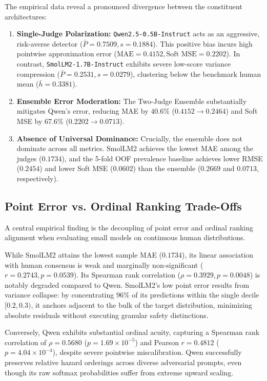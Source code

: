 The empirical data reveal a pronounced divergence between the constituent architectures:
\begin{enumerate}
    \item \textbf{Single-Judge Polarization:} \texttt{Qwen2.5-0.5B-Instruct} acts as an aggressive, risk-averse detector ($\bar{P}=0.7509, s=0.1884$). This positive bias incurs high pointwise approximation error ($\text{MAE}=0.4152, \text{Soft MSE}=0.2202$). In contrast, \texttt{SmolLM2-1.7B-Instruct} exhibits severe low-score variance compression ($\bar{P}=0.2531, s=0.0279$), clustering below the benchmark human mean ($\bar{h}=0.3381$).
    \item \textbf{Ensemble Error Moderation:} The Two-Judge Ensemble substantially mitigates Qwen's error, reducing MAE by $40.6\%$ ($0.4152 \to 0.2464$) and Soft MSE by $67.6\%$ ($0.2202 \to 0.0713$).
    \item \textbf{Absence of Universal Dominance:} Crucially, the ensemble does not dominate across all metrics. SmolLM2 achieves the lowest MAE among the judges ($0.1734$), and the 5-fold OOF prevalence baseline achieves lower RMSE ($0.2454$) and lower Soft MSE ($0.0602$) than the ensemble ($0.2669$ and $0.0713$, respectively).
\end{enumerate}

\subsection{Point Error vs. Ordinal Ranking Trade-Offs}
\label{subsec:error_agreement}

A central empirical finding is the decoupling of point error and ordinal ranking alignment when evaluating small models on continuous human distributions.

While SmolLM2 attains the lowest sample MAE ($0.1734$), its linear association with human consensus is weak and marginally non-significant ($r=0.2743, p=0.0539$). Its Spearman rank correlation ($\rho=0.3929, p=0.0048$) is notably degraded compared to Qwen. SmolLM2's low point error results from variance collapse: by concentrating $96\%$ of its predictions within the single decile $[0.2, 0.3)$, it anchors adjacent to the bulk of the target distribution, minimizing absolute residuals without executing granular safety distinctions.

Conversely, Qwen exhibits substantial ordinal acuity, capturing a Spearman rank correlation of $\rho=0.5680$ ($p=1.69\times 10^{-5}$) and Pearson $r=0.4812$ ($p=4.04\times 10^{-4}$), despite severe pointwise miscalibration. Qwen successfully preserves relative hazard orderings across diverse adversarial prompts, even though its raw softmax probabilities suffer from extreme upward scaling.

